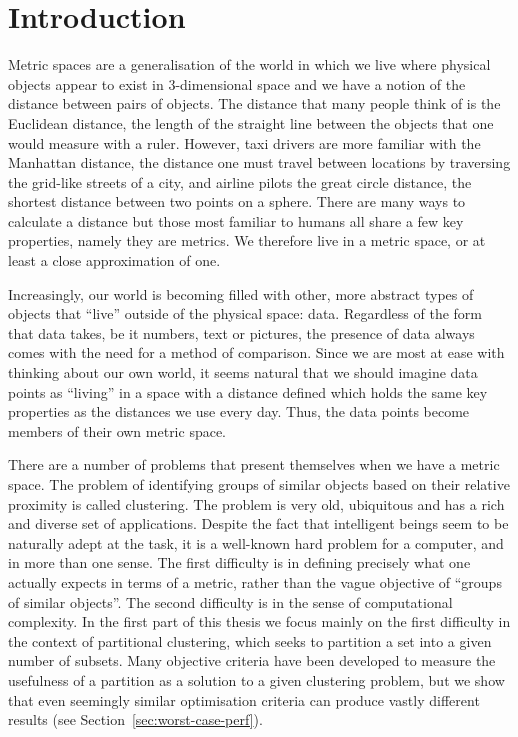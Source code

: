 \chapter{Introduction}
\label{cha:introduction}

Metric spaces are a generalisation of the world in which we live where
physical objects appear to exist in 3-dimensional space and we have a notion
of the distance between pairs of objects.  The distance that many people think
of is the Euclidean distance, the length of the straight line between the
objects that one would measure with a ruler.  However, taxi drivers are more
familiar with the Manhattan distance, the distance one must travel between
locations by traversing the grid-like streets of a city, and airline pilots
the great circle distance, the shortest distance between two points on a
sphere.  There are many ways to calculate a distance but those most familiar
to humans all share a few key properties, namely they are metrics.  We
therefore live in a metric space, or at least a close approximation of one.

Increasingly, our world is becoming filled with other, more abstract types of
objects that ``live'' outside of the physical space: data.  Regardless of the
form that data takes, be it numbers, text or pictures, the presence of data
always comes with the need for a method of comparison.  Since we are most at
ease with thinking about our own world, it seems natural that we should
imagine data points as ``living'' in a space with a distance defined which
holds the same key properties as the distances we use every day.  Thus, the
data points become members of their own metric space.

There are a number of problems that present themselves when we have a metric
space.  The problem of identifying groups of similar objects based on their
relative proximity is called clustering.  The problem is very old, ubiquitous
and has a rich and diverse set of applications.  Despite the fact that
intelligent beings seem to be naturally adept at the task, it is a well-known
hard problem for a computer, and in more than one sense.  The first difficulty
is in defining precisely what one actually expects in terms of a metric,
rather than the vague objective of ``groups of similar objects''.  The second
difficulty is in the sense of computational complexity.  In the first part of
this thesis we focus mainly on the first difficulty in the context of
partitional clustering, which seeks to partition a set into a given number of
subsets.  Many objective criteria have been developed to measure the
usefulness of a partition as a solution to a given clustering problem, but we
show that even seemingly similar optimisation criteria can produce vastly
different results (see Section~\ref{sec:worst-case-perf}).

